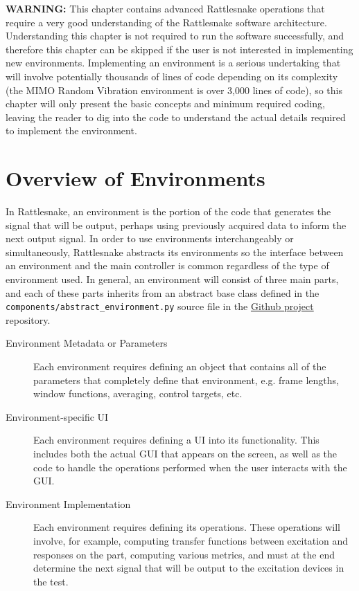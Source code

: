\documentclass[pdf,12pt,report]{SANDreport}
\newcommand{\inlineCode}{\lstinline[basicstyle=\bfseries\ttfamily]}
\newcommand{\GitlabProject}{\href{https://github.com/sandialabs/rattlesnake-vibration-controller}{Github project}}
\begin{document}
    \textbf{WARNING:} This chapter contains advanced Rattlesnake operations that require a very good understanding of the Rattlesnake software architecture.  Understanding this chapter is not required to run the software successfully, and therefore this chapter can be skipped if the user is not interested in implementing new environments.  Implementing an environment is a serious undertaking that will involve potentially thousands of lines of code depending on its complexity (the \Ac{MIMO} Random Vibration environment is over 3,000 lines of code), so this chapter will only present the basic concepts and minimum required coding, leaving the reader to dig into the code to understand the actual details required to implement the environment.
    
    \section{Overview of Environments}
    In Rattlesnake, an environment is the portion of the code that generates the signal that will be output, perhaps using previously acquired data to inform the next output signal.  In order to use environments interchangeably or simultaneously, Rattlesnake abstracts its environments so the interface between an environment and the main controller is common regardless of the type of environment used.  In general, an environment will consist of three main parts, and each of these parts inherits from an abstract base class defined in the \inlineCode{components/abstract_environment.py} source file in the \GitlabProject{} repository.
    
    \begin{description}
    \item[Environment Metadata or Parameters]Each environment requires defining an object that contains all of the parameters that completely define that environment, e.g. frame lengths, window functions, averaging, control targets, etc.
    \item[Environment-specific \ac{UI}] Each environment requires defining a \ac{UI} into its functionality.  This includes both the actual \ac{GUI} that appears on the screen, as well as the code to handle the operations performed when the user interacts with the \ac{GUI}.
    \item[Environment Implementation] Each environment requires defining its operations.  These operations will involve, for example, computing transfer functions between excitation and responses on the part, computing various metrics, and must at the end determine the next signal that will be output to the excitation devices in the test.
    \end{description}
    
\end{document}
